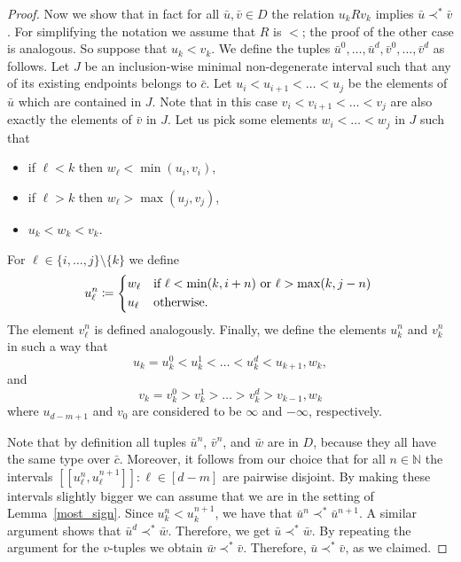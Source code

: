 \documentclass[10pt,a4paper]{amsart}
\begin{document}
\begin{proof}
	Now we show that in fact for all $\bar{u},\bar{v}\in D$ the relation $u_kRv_k$ implies $\bar{u}\prec^*\bar{v}$. For simplifying the notation we assume that $R$ is $<$; the proof of the other case is analogous. So suppose that $u_k < v_k$. We define the tuples $\bar{u}^0,\dots,\bar{u}^d,\bar{v}^0,\dots,\bar{v}^d$
    as follows. Let $J$
    be an inclusion-wise minimal non-degenerate interval {such that any of its existing endpoints belongs to $\bar{c}$.}
   Let $u_i<u_{i+1}<\dots<u_j$ be the elements of $\bar{u}$ which are contained in $J$. Note that in this case $v_i<v_{i+1}<\dots<v_j$ are also exactly the elements of $\bar{v}$ in $J$. Let us pick some elements $w_i<\dots<w_j$ {in $J$} such that
	
\begin{itemize}
\item if $\ell<k$ then $w_{\ell}<\min(u_i,v_i)$,
\item if $\ell>k$ then $w_{\ell}>\max(u_j,v_j)$,
\item $u_k<w_k<v_k$.
\end{itemize}
For $\ell\in \{i,\dots,j\} \setminus \{k\}$ we define
\[
u^n_{\ell}\coloneqq 
\begin{cases*}
w_{\ell} & if $\ell<\min(k,i+n)$ or $\ell>\max(k,j-n)$ \\
u_{\ell} & otherwise.
\end{cases*}
\]
	The element $v^n_{\ell}$ is defined analogously. Finally, we define the elements $u^n_k$ and $v^n_k$ in such a way that
\[
u_k=u^0_k<u^1_k<\dots<u^d_k<u_{k+1},w_k,
\]
	and
\[
v_k=v^0_k>v^1_k>\dots>v^d_k>v_{k-1},w_k
\]
	{where $u_{d-m+1}$ and $v_0$ are considered to be $\infty$ and $-\infty$, respectively.}

	Note that by definition all tuples $\bar{u}^n$, $\bar{v}^n$, and $\bar{w}$ are in $D$, because they all have the same type over $\bar{c}$. Moreover, it follows from our choice that for all $n\in \mathbb{N}$ the intervals $[[u^n_{\ell},u^{n+1}_{\ell}]]: \ell\in [d-m]$ are pairwise disjoint. By making these intervals slightly bigger {we can assume that} we are in the setting of Lemma~\ref{most_sign}. Since ${u^n_k<u^{n+1}_k}$, we have that $\bar{u}^n\prec^*\bar{u}^{n+1}$. A similar argument shows that $\bar{u}^d\prec^*\bar{w}$. Therefore, we get $\bar{u}\prec^*\bar{w}$. By repeating the argument for the $v$-tuples we obtain $\bar{w}\prec^*\bar{v}$. Therefore, $\bar{u}\prec^*\bar{v}$, as we claimed.


\end{proof}
\end{document}
